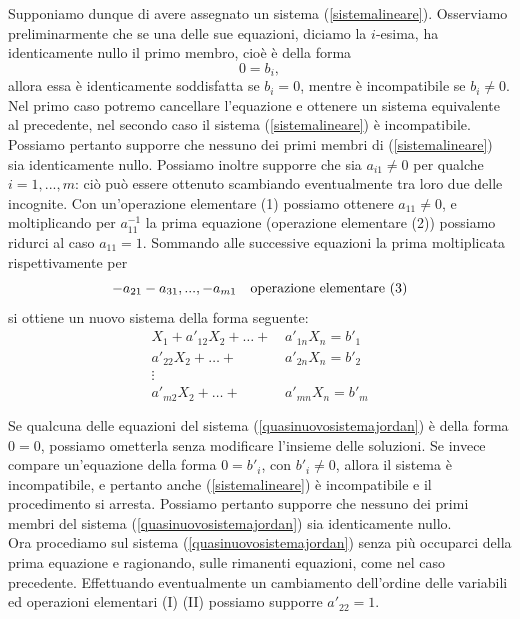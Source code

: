 \documentclass{article}
\theoremstyle{plain}
\theoremstyle{definition}
\theoremstyle{remark}
\begin{document}
Supponiamo dunque di avere assegnato un sistema (\ref{sistemalineare}). 
Osserviamo preliminarmente che se una delle sue equazioni, diciamo la \( i \)-esima, ha identicamente nullo il primo membro, cioè è della forma
\[
    0 = b_i,
\]
allora essa è identicamente soddisfatta se \( b_i = 0 \), mentre è incompatibile se \( b_i \neq 0 \).
Nel primo caso potremo cancellare l'equazione e ottenere un sistema equivalente al precedente, nel secondo caso il sistema (\ref{sistemalineare}) è incompatibile. 
Possiamo pertanto supporre che nessuno dei primi membri di (\ref{sistemalineare}) sia identicamente nullo.
Possiamo inoltre supporre che sia $a_{i1}\neq0$ per qualche $i=1,...,m$: ciò può essere ottenuto scambiando eventualmente tra loro due delle incognite. 
Con un'operazione elementare (1) possiamo ottenere $a_{11}\neq0$, e moltiplicando per $a_{11}^{-1}$ la prima equazione (operazione elementare (2)) 
possiamo ridurci al caso $a_{11}=1$.
Sommando alle successive equazioni la prima moltiplicata rispettivamente per \[-a_{21}-a_{31},...,-a_{m1}\quad\textup{operazione elementare }(3)\] 
si ottiene un nuovo sistema della forma seguente:
\begin{equation}
    \begin{aligned}
        X_1 + a'_{12}X_2  + \ldots + \,&a'_{1n}X_n = b'_1 \\
        a'_{22}X_2 + \ldots + \,&a'_{2n}X_n = b'_2 \\
        \vdots\quad\;\,& \\
        a'_{m2}X_2 + \ldots + &a'_{mn}X_n = b'_m \\\\
    \end{aligned}\label{quasinuovosistemajordan}
\end{equation}
Se qualcuna delle equazioni del sistema (\ref{quasinuovosistemajordan}) è della forma $0=0$, possiamo ometterla senza modificare l'insieme delle soluzioni.
Se invece compare un'equazione della forma $0=b'_i$, con $b'_i\neq0$, allora il sistema è incompatibile, e pertanto anche (\ref{sistemalineare}) è incompatibile e il procedimento si arresta. 
Possiamo pertanto supporre che nessuno dei primi membri del sistema (\ref{quasinuovosistemajordan}) sia identicamente nullo.\\
Ora procediamo sul sistema (\ref{quasinuovosistemajordan}) senza più occuparci della prima equazione e ragionando, sulle 
rimanenti equazioni, come nel caso precedente. Effettuando eventualmente un cambiamento dell'ordine delle 
variabili ed operazioni elementari (I) (II) possiamo supporre $a'_{22}=1$. 
\end{document}
